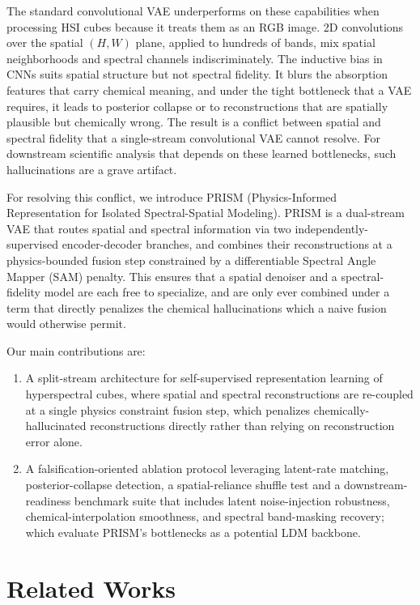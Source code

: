 \documentclass[twoside,11pt]{article}
\begin{document}
The standard convolutional VAE underperforms on these capabilities when processing HSI cubes because it treats them as an RGB image. 2D convolutions over the spatial $(H, W)$ plane, applied to hundreds of bands, mix spatial neighborhoods and spectral channels indiscriminately. The inductive bias in CNNs suits spatial structure but not spectral fidelity. It blurs the absorption features that carry chemical meaning, and under the tight bottleneck that a VAE requires, it leads to posterior collapse \citep{bowman2016generating} or to reconstructions that are spatially plausible but chemically wrong. The result is a conflict between spatial and spectral fidelity that a single-stream convolutional VAE cannot resolve. For downstream scientific analysis that depends on these learned bottlenecks, such hallucinations are a grave artifact.

For resolving this conflict, we introduce PRISM (Physics-Informed Representation for Isolated Spectral-Spatial Modeling). PRISM is a dual-stream VAE that routes spatial and spectral information via two independently-supervised encoder-decoder branches, and combines their reconstructions at a physics-bounded fusion step constrained by a differentiable Spectral Angle Mapper (SAM) penalty. This ensures that a spatial denoiser and a spectral-fidelity model are each free to specialize, and are only ever combined under a term that directly penalizes the chemical hallucinations which a naive fusion would otherwise permit.

Our main contributions are:
\begin{enumerate}
  \item A split-stream architecture for self-supervised representation learning of hyperspectral cubes, where spatial and spectral reconstructions are re-coupled at a single physics constraint fusion step, which penalizes chemically-hallucinated reconstructions directly rather than relying on reconstruction error alone.
  \item A falsification-oriented ablation protocol leveraging latent-rate matching, posterior-collapse detection, a spatial-reliance shuffle test and a downstream-readiness benchmark suite that includes latent noise-injection robustness, chemical-interpolation smoothness, and spectral band-masking recovery; which evaluate PRISM's bottlenecks as a potential LDM backbone.
\end{enumerate}

\section{Related Works}
\label{sec:related}
\end{document}
